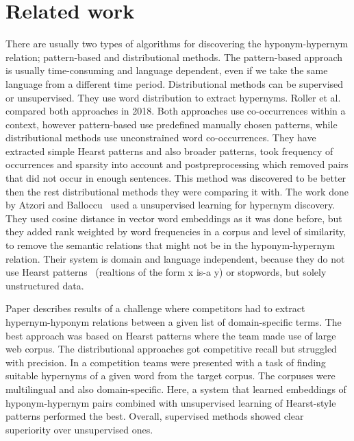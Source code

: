 \documentclass[fleqn,moreauthors,10pt]{ds_report}
\begin{document}
\section{Related work}
There are usually two types of algorithms for discovering the hyponym-hypernym relation; pattern-based and distributional methods. The pattern-based approach is usually time-consuming and language dependent, even if we take the same language from a different time period. Distributional methods can be supervised or unsupervised. They use word distribution to extract hypernyms. Roller et al. \cite{DBLP:journals/corr/abs-1806-03191} compared both approaches in 2018. Both approaches use co-occurrences within a context, however pattern-based use predefined manually chosen patterns, while distributional methods use unconstrained word co-occurrences. They have extracted simple Hearst patterns and also broader patterns, took frequency of occurrences and sparsity into account and postpreprocessing which removed pairs that did not occur in enough sentences. This method was discovered to be better then the rest distributional methods they were comparing it with.  
The work done by Atzori and Balloccu~\cite{Atzori2020} used a unsupervised learning for hypernym discovery. They used cosine distance in vector word embeddings as it was done before, but they added rank weighted by word frequencies in a corpus and level of similarity, to remove the semantic relations that might not be in the hyponym-hypernym relation. Their system is domain and language independent, because they do not use Hearst patterns~\cite{hearst-1992-automatic} (realtions of the form x is-a y) or stopwords, but solely unstructured data.

Paper \cite{bordea-etal-2016-semeval} describes results of a challenge where competitors had to extract hypernym-hyponym relations between a given list of domain-specific terms. The best approach was based on Hearst patterns where the team made use of large web corpus. The distributional approaches got competitive recall but struggled with precision. In a competition \cite{camacho-collados-etal-2018-semeval} teams were presented with a task of finding suitable hypernyms of a given word from the target corpus. The corpuses were multilingual and also domain-specific. Here, a system that learned embeddings of hyponym-hypernym pairs combined with unsupervised learning of Hearst-style patterns performed the best. Overall, supervised methods showed clear superiority over unsupervised ones.
\end{document}
